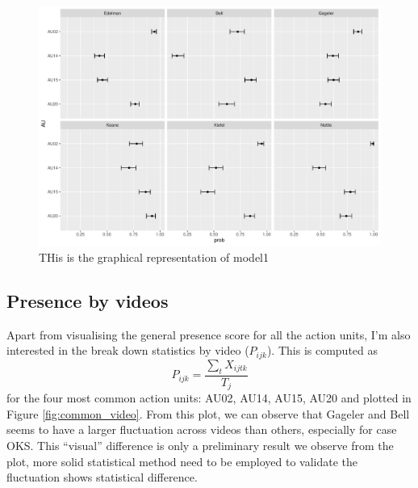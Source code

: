 \documentclass{monashthesis}
\begin{document}
\begin{figure}

{\centering \includegraphics[width=1\linewidth]{figures/unnamed-chunk-9-1} 

}

\caption{THis is the graphical representation of model1\label{fig:model_1_plot}}\label{fig:unnamed-chunk-9}
\end{figure}

\hypertarget{presence-by-videos}{%
\subsection{Presence by videos}\label{presence-by-videos}}

Apart from visualising the general presence score for all the action units, I'm also interested in the break down statistics by video (\(P_{ijk}\)). This is computed as \[P_{ijk} = \frac{\sum_{t}X_{ijtk}}{T_j}\] for the four most common action units: AU02, AU14, AU15, AU20 and plotted in Figure \ref{fig:common_video}. From this plot, we can observe that Gageler and Bell seems to have a larger fluctuation across videos than others, especially for case OKS. This ``visual'' difference is only a preliminary result we observe from the plot, more solid statistical method need to be employed to validate the fluctuation shows statistical difference.
\end{document}
